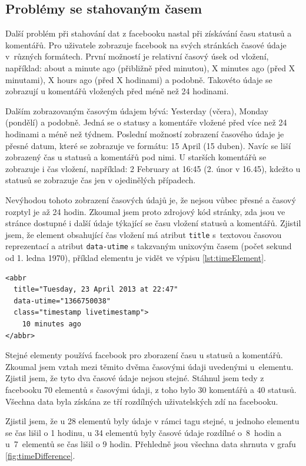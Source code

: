\documentclass[thesis=M,czech]{FITthesis}[2013/05/10]
\begin{document}
\subsection{Problémy se stahovaným časem}

Další problém při stahování dat z facebooku nastal při získávání času statusů a komentářů. Pro uživatele zobrazuje facebook na svých stránkách časové údaje v~různých formátech. První možností je relativní časový úsek od vložení, například: about a minute ago (přibližně před minutou), X minutes ago (před X minutami), X hours ago (před X hodinami) a podobně. Takovéto údaje se zobrazují u komentářů vložených před méně než 24 hodinami. 

Dalším zobrazovaným časovým údajem bývá: Yesterday (včera), Monday (pondělí) a podobně. Jedná se o statusy a komentáře vložené před více než 24 hodinami a méně než týdnem. Poslední možností zobrazení časového údaje je přesné datum, které se zobrazuje ve formátu: 15 April (15 duben). Navíc se liší zobrazený čas u statusů a komentářů pod nimi. U starších komentářů se zobrazuje i čas vložení, například: 2 February at 16:45 (2. únor v 16.45), kdežto u statusů se zobrazuje čas jen v ojedinělých případech.

Nevýhodou tohoto zobrazení časových údajů je, že nejsou vůbec přesné a časový rozptyl je až 24 hodin. Zkoumal jsem proto zdrojový kód stránky, zda jsou ve stránce dostupné i další údaje týkající se času vložení statusů a komentářů. Zjistil jsem, že element obsahující čas vložení má atribut \verb|title| s~textovou časovou reprezentací a atribut \verb|data-utime| s takzvaným unixovým časem (počet sekund od 1. ledna 1970), příklad elementu je vidět ve výpisu \ref{lst:timeElement}. 

\begin{lstlisting}[caption={Příklad elementu obsahující čas},label=lst:timeElement,belowcaptionskip=0.4cm]
<abbr 
  title="Tuesday, 23 April 2013 at 22:47"
  data-utime="1366750038" 
  class="timestamp livetimestamp">
    10 minutes ago
</abbr>
\end{lstlisting}

Stejné elementy používá facebook pro zborazení času u statusů a komentářů. Zkoumal jsem vztah mezi těmito dvěma časovými údaji uvedenými u~elementu. Zjistil jsem, že tyto dva časové údaje nejsou stejné. Stáhnul jsem tedy z facebooku 70 elementů s časovými údaji, z toho bylo 30 komentářů a 40 statusů. Všechna data byla získána ze tří rozdílných uživatelských zdí na facebooku. 

Zjistil jsem, že u 28 elementů byly údaje v rámci tagu stejné, u jednoho elementu se čas lišil o 1 hodinu, u 34 elementů byly časové údaje rozdílné o~8~hodin a u~7~elementů se čas lišil o 9 hodin. Přehledně jsou všechna data shrnuta v grafu \ref{fig:timeDifference}.
\end{document}
